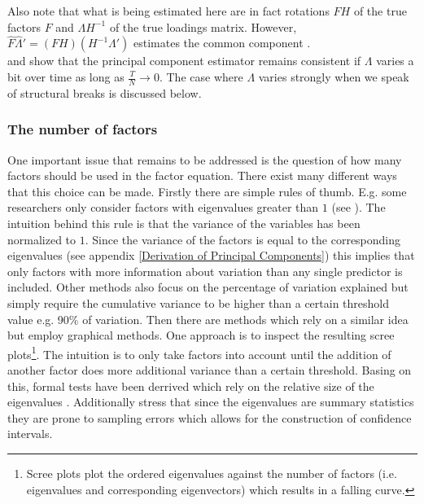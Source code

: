 \documentclass[12pt]{article}
\begin{document}
Also note that what is being estimated here are in fact rotations $FH$ of the true factors $F$ and $\Lambda H^{-1}$ of the true loadings matrix. However, $\hat F \hat \Lambda' = (FH) (H^{-1}\Lambda')$ estimates the common component \citep{bai2013principal}. \\

\citet{stock1998diffusion} and \citet{stock2002macroeconomic} show that the principal component estimator remains consistent if $\Lambda$ varies a bit over time as long as $\frac{T}{N} \to 0$. The case where $\Lambda$ varies strongly when we speak of structural breaks is discussed below.

%

\subsubsection{The number of factors}
One important issue that remains to be addressed is the question of how many factors should be used in the factor equation. There exist many different ways that this choice can be made. Firstly there are simple rules of thumb. E.g. some researchers only consider factors with eigenvalues greater than $1$ (see \citet{larsen2010estimating}). The intuition behind this rule is that the variance of the variables has been normalized to $1$. Since the variance of the factors is equal to the corresponding eigenvalues (see appendix \ref{Derivation of Principal Components}) this implies that only factors with more information about variation than any single predictor is included. Other methods also focus on the percentage of variation explained but simply require the cumulative variance to be higher than a certain threshold value e.g. 90\% of variation. Then there are methods which rely on a similar idea but employ graphical methods. One approach is to inspect the resulting scree plots\footnote{Scree plots plot the ordered eigenvalues against the number of factors (i.e. eigenvalues and corresponding eigenvectors) which results in a falling curve.}. The intuition is to only take factors into account until the addition of another factor does more additional variance than a certain threshold. Basing on this, formal tests have been derrived which rely on the relative size of the eigenvalues \citep{stock2011dynamic}. Additionally \citet{larsen2010estimating} stress that since the eigenvalues are summary statistics they are prone to sampling errors which allows for the construction of confidence intervals.
\end{document}
